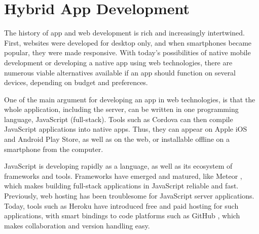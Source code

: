 \section{Hybrid App Development}

The history of app and web development is rich and increasingly intertwined. First, websites were developed for desktop only, and when smartphones became popular, they were made responsive. With today's possibilities of native mobile development or developing a native app using web technologies, there are numerous viable alternatives available if an app should function on several devices, depending on budget and preferences.

One of the main argument for developing an app in web technologies, is that the whole application, including the server, can be written in one programming language, JavaScript (full-stack). Tools such as Cordova \citep*{cordova} can then compile JavaScript applications into native apps. Thus, they can appear on Apple iOS and Android Play Store, as well as on the web, or installable offline on a smartphone from the computer.

JavaScript is developing rapidly as a language, as well as its ecosystem of frameworks and tools. Frameworks have emerged and matured, like Meteor \citep*{meteor}, which makes building full-stack applications in JavaScript reliable and fast. Previously, web hosting has been troublesome for JavaScript server applications. Today, tools such as Heroku \citep*{heroku} have introduced free and paid hosting for such applications, with smart bindings to code platforms such as GitHub \citep*{github}, which makes collaboration and version handling easy.
